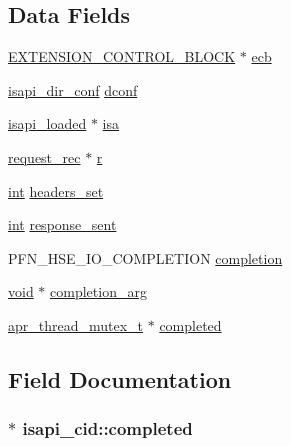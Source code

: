 \subsection*{Data Fields}
\begin{DoxyCompactItemize}
\item 
\hyperlink{structEXTENSION__CONTROL__BLOCK}{E\+X\+T\+E\+N\+S\+I\+O\+N\+\_\+\+C\+O\+N\+T\+R\+O\+L\+\_\+\+B\+L\+O\+CK} $\ast$ \hyperlink{structisapi__cid_ab88ba7d4ff61c15e25e554823d03bdd0}{ecb}
\item 
\hyperlink{structisapi__dir__conf}{isapi\+\_\+dir\+\_\+conf} \hyperlink{structisapi__cid_aac3d90fd58a03f63d36749a9c5f0c0d2}{dconf}
\item 
\hyperlink{structisapi__loaded}{isapi\+\_\+loaded} $\ast$ \hyperlink{structisapi__cid_a21548c52b203da95df38a01a5616d108}{isa}
\item 
\hyperlink{structrequest__rec}{request\+\_\+rec} $\ast$ \hyperlink{structisapi__cid_a93104c7dab08de6dcef6882f322c0ebc}{r}
\item 
\hyperlink{pcre_8txt_a42dfa4ff673c82d8efe7144098fbc198}{int} \hyperlink{structisapi__cid_a6b64d85e3dc239af8883316d1c0af64c}{headers\+\_\+set}
\item 
\hyperlink{pcre_8txt_a42dfa4ff673c82d8efe7144098fbc198}{int} \hyperlink{structisapi__cid_ad0b3c4b221c4700ce8e51ed9830ae3f0}{response\+\_\+sent}
\item 
P\+F\+N\+\_\+\+H\+S\+E\+\_\+\+I\+O\+\_\+\+C\+O\+M\+P\+L\+E\+T\+I\+ON \hyperlink{structisapi__cid_aa8a9f34b7b87f8742150c3cd22d6cfec}{completion}
\item 
\hyperlink{group__MOD__ISAPI_gacd6cdbf73df3d9eed42fa493d9b621a6}{void} $\ast$ \hyperlink{structisapi__cid_a6d796fbfc7d16f86e3f9cbcb85a7ba90}{completion\+\_\+arg}
\item 
\hyperlink{structapr__thread__mutex__t}{apr\+\_\+thread\+\_\+mutex\+\_\+t} $\ast$ \hyperlink{structisapi__cid_a36f0bcab63f6b98d21beee5f21127206}{completed}
\end{DoxyCompactItemize}


\subsection{Field Documentation}
\subsubsection[{\texorpdfstring{completed}{completed}}]{$\ast$ isapi\+\_\+cid\+::completed}\hypertarget{structisapi__cid_a36f0bcab63f6b98d21beee5f21127206}{}\label{structisapi__cid_a36f0bcab63f6b98d21beee5f21127206}
